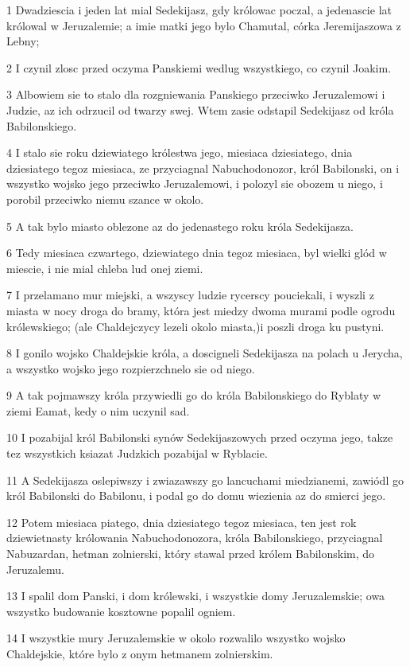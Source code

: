 \par 1 Dwadziescia i jeden lat mial Sedekijasz, gdy królowac poczal, a jedenascie lat królowal w Jeruzalemie; a imie matki jego bylo Chamutal, córka Jeremijaszowa z Lebny;
\par 2 I czynil zlosc przed oczyma Panskiemi wedlug wszystkiego, co czynil Joakim.
\par 3 Albowiem sie to stalo dla rozgniewania Panskiego przeciwko Jeruzalemowi i Judzie, az ich odrzucil od twarzy swej. Wtem zasie odstapil Sedekijasz od króla Babilonskiego.
\par 4 I stalo sie roku dziewiatego królestwa jego, miesiaca dziesiatego, dnia dziesiatego tegoz miesiaca, ze przyciagnal Nabuchodonozor, król Babilonski, on i wszystko wojsko jego przeciwko Jeruzalemowi, i polozyl sie obozem u niego, i porobil przeciwko niemu szance w okolo.
\par 5 A tak bylo miasto oblezone az do jedenastego roku króla Sedekijasza.
\par 6 Tedy miesiaca czwartego, dziewiatego dnia tegoz miesiaca, byl wielki glód w miescie, i nie mial chleba lud onej ziemi.
\par 7 I przelamano mur miejski, a wszyscy ludzie rycerscy pouciekali, i wyszli z miasta w nocy droga do bramy, która jest miedzy dwoma murami podle ogrodu królewskiego; (ale Chaldejczycy lezeli okolo miasta,)i poszli droga ku pustyni.
\par 8 I gonilo wojsko Chaldejskie króla, a doscigneli Sedekijasza na polach u Jerycha, a wszystko wojsko jego rozpierzchnelo sie od niego.
\par 9 A tak pojmawszy króla przywiedli go do króla Babilonskiego do Ryblaty w ziemi Eamat, kedy o nim uczynil sad.
\par 10 I pozabijal król Babilonski synów Sedekijaszowych przed oczyma jego, takze tez wszystkich ksiazat Judzkich pozabijal w Ryblacie.
\par 11 A Sedekijasza oslepiwszy i zwiazawszy go lancuchami miedzianemi, zawiódl go król Babilonski do Babilonu, i podal go do domu wiezienia az do smierci jego.
\par 12 Potem miesiaca piatego, dnia dziesiatego tegoz miesiaca, ten jest rok dziewietnasty królowania Nabuchodonozora, króla Babilonskiego, przyciagnal Nabuzardan, hetman zolnierski, który stawal przed królem Babilonskim, do Jeruzalemu.
\par 13 I spalil dom Panski, i dom królewski, i wszystkie domy Jeruzalemskie; owa wszystko budowanie kosztowne popalil ogniem.
\par 14 I wszystkie mury Jeruzalemskie w okolo rozwalilo wszystko wojsko Chaldejskie, które bylo z onym hetmanem zolnierskim.
